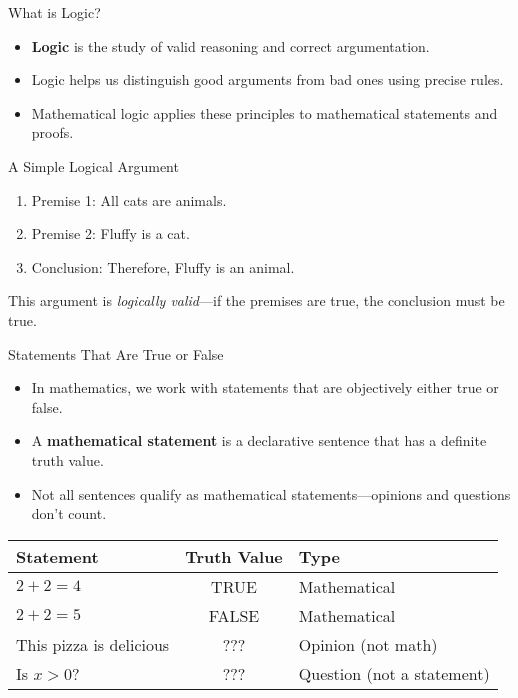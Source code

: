 \documentclass[aspectratio=169]{beamer}
\begin{document}
\begin{frame}{What is Logic?}

\begin{itemize}
    \item \textbf{Logic} is the study of valid reasoning and correct argumentation.
    \item Logic helps us distinguish good arguments from bad ones using precise rules.
    \item Mathematical logic applies these principles to mathematical statements and proofs.
\end{itemize}

\begin{block}{A Simple Logical Argument}
\begin{enumerate}
    \item Premise 1: All cats are animals.
    \item Premise 2: Fluffy is a cat.
    \item Conclusion: Therefore, Fluffy is an animal.
\end{enumerate}
This argument is \textit{logically valid}—if the premises are true, the conclusion must be true.
\end{block}

\end{frame}

\begin{frame}{Statements That Are True or False}

\begin{itemize}
    \item In mathematics, we work with statements that are objectively either true or false.
    \item A \textbf{mathematical statement} is a declarative sentence that has a definite truth value.
    \item Not all sentences qualify as mathematical statements—opinions and questions don't count.
\end{itemize}

\begin{table}
\centering
\begin{tabular}{|l|c|l|}
\hline
\textbf{Statement} & \textbf{Truth Value} & \textbf{Type} \\
\hline
$2 + 2 = 4$ & TRUE & Mathematical \\
$2 + 2 = 5$ & FALSE & Mathematical \\
This pizza is delicious & ??? & Opinion (not math) \\
Is $x > 0$? & ??? & Question (not a statement) \\
\hline
\end{tabular}
\end{table}

\end{frame}
\end{document}
